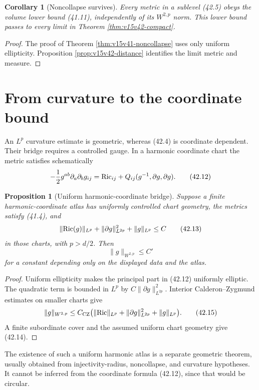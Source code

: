 \documentclass[11pt]{article}
\newtheorem{proposition}[theorem]{Proposition}
\newtheorem{corollary}[theorem]{Corollary}
\theoremstyle{remark}
\begin{document}
\begin{corollary}[Noncollapse survives]
\label{cor:v15v42-noncollapse}
Every metric in a sublevel (42.5) obeys the volume lower bound
(41.11), independently of its \(W^{2,p}\) norm.  This lower bound
passes to every limit in Theorem \ref{thm:v15v42-compact}.
\end{corollary}

\begin{proof}
The proof of Theorem \ref{thm:v15v41-noncollapse} uses only uniform
ellipticity.  Proposition \ref{prop:v15v42-distance} identifies the
limit metric and measure.
\end{proof}

\section{From curvature to the coordinate bound}

An \(L^p\) curvature estimate is geometric, whereas (42.4) is
coordinate dependent.  Their bridge requires a controlled gauge.
In a harmonic coordinate chart the metric satisfies schematically
\[
 -\frac12g^{ab}\partial_a\partial_b g_{ij}
 ={\rm Ric}_{ij}+Q_{ij}(g^{-1},\partial g,\partial g).   \tag{42.12}
\]

\begin{proposition}[Uniform harmonic-coordinate bridge]
\label{prop:v15v42-harmonic}
Suppose a finite harmonic-coordinate atlas has uniformly controlled
chart geometry, the metrics satisfy (41.4), and
\[
 \|{\rm Ric}(g)\|_{L^p}
 +\|\partial g\|_{L^{2p}}^2
 +\|g\|_{L^p}\leq C                                    \tag{42.13}
\]
in those charts, with \(p>d/2\).  Then
\[
 \|g\|_{W^{2,p}}\leq C'                                 \tag{42.14}
\]
for a constant depending only on the displayed data and the atlas.
\end{proposition}

\begin{proof}
Uniform ellipticity makes the principal part in (42.12) uniformly
elliptic.  The quadratic term is bounded in \(L^p\) by
\(C\|\partial g\|_{L^{2p}}^2\).  Interior
Calderon--Zygmund estimates on smaller charts give
\[
 \|g\|_{W^{2,p}}
 \leq C_{\rm CZ}
 \bigl(\|{\rm Ric}\|_{L^p}
       +\|\partial g\|_{L^{2p}}^2+\|g\|_{L^p}\bigr).
                                                               \tag{42.15}
\]
A finite subordinate cover and the assumed uniform chart geometry
give (42.14).
\end{proof}

The existence of such a uniform harmonic atlas is a separate
geometric theorem, usually obtained from injectivity-radius,
noncollapse, and curvature hypotheses.  It cannot be inferred from
the coordinate formula (42.12), since that would be circular.
\end{document}

